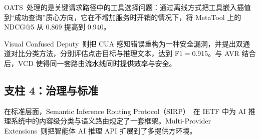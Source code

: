 OATS~\cite{oats2026}处理的是关键请求路径中的工具选择问题：通过离线方式把工具嵌入插值到“成功查询”质心方向，它在不增加服务时开销的情况下，将 MetaTool 上的 NDCG@5 从 0.869 提高到 0.940。

Visual Confused Deputy~\cite{vcd2026}则把 CUA 感知错误重构为一种安全漏洞，并提出双通道对比分类方法，分别评估点击目标与推理文本，达到 F1$=$0.915。与 AVR 结合后，VCD 使得同一套路由流水线同时提供效率与安全。

\subsection{支柱 4：治理与标准}
\label{sec:foundation:governance}

在标准层面，Semantic Inference Routing Protocol（SIRP）~\cite{sirp2025}在 IETF 中为 AI 推理系统中的内容级分类与语义路由规定了一套框架。Multi-Provider Extensions~\cite{mpext2025}则把智能体 AI 推理 API 扩展到了多提供方环境。

